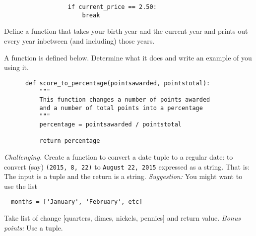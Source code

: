 \documentclass[11pt]{exam}
\begin{document}
\begin{questions}
\begin{verbatim}
                  if current_price == 2.50:
                      break
    \end{verbatim}

  \item Define a function that takes your birth year and the current year and prints out every year inbetween (and including) those years.

  \item A function is defined below. Determine what it does and write an example of you using it.
    \begin{verbatim}
      def score_to_percentage(pointsawarded, pointstotal):
          """
          This function changes a number of points awarded
          and a number of total points into a percentage
          """
          percentage = pointsawarded / pointstotal

          return percentage
    \end{verbatim}

  \item {\it Challenging.\/}
  Create a function to convert a date tuple to a regular date:
  to convert (say) \texttt{(2015, 8, 22)} to \texttt{August 22, 2015} expressed as a string.
  That is:  The input is a tuple and the return is a string.
  {\it Suggestion:\/} You might want to use the list
  \begin{verbatim}
  months = ['January', 'February', etc]
  \end{verbatim}

  \item Take list of change [quarters, dimes, nickels, pennies] and return value.
  {\it Bonus points:\/} Use a tuple.

\end{questions}
\end{document}
